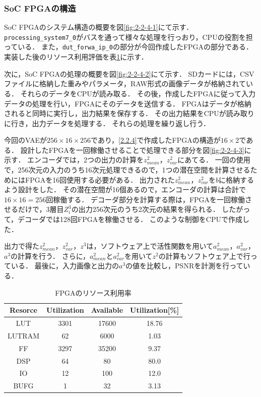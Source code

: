 \documentclass[paper]{ieicej}
\begin{document}
\subsubsection{SoC FPGAの構造}\label{2.2.5}
SoC FPGAのシステム構造の概要を図\ref{fig:2-2-4-1}にて示す．
\texttt{processing\_system7\_0}がバスを通って様々な処理を行っおり，CPUの役割を担っている．
また，\texttt{dut\_forwa\_ip\_0}の部分が今回作成したFPGAの部分である．
実装した後のリソース利用評価を表\ref{tb:3}に示す．

次に，SoC FPGAの処理の概要を図\ref{fig:2-2-4-2}にて示す．
SDカードには，CSVファイルに格納した重みやパラメータ，RAW形式の画像データが格納されている．
それらのデータをCPUが読み取る．
その後，作成したFPGAに従って入力データの処理を行い，FPGAにそのデータを送信する．
FPGAはデータが格納されると同時に実行し，出力結果を保存する．
その出力結果をCPUが読み取りに行き，出力データを処理する．
それらの処理を繰り返し行う．

今回のVAEが$256\times16\times256$であり，\ref{2.2.4}で作成したFPGAの構造が$16\times2$である．
設計したFPGAを一回稼働させることで処理できる部分を図\ref{fig:2-2-4-3}に示す．
エンコーダでは，2つの出力の計算を$z^2_{mean}$，$z^2_{var}$にあてる．
一回の使用で，256次元の入力のうち16次元処理できるので，1つの潜在空間を計算させるためにはFPGAを16回使用する必要がある．
出力された$z^2_{mean}$，$z^2_{var}$を$b$に格納するよう設計をした．
その潜在空間が16個あるので，エンコーダの計算は合計で$16\times16=256$回稼働する．
デコーダ部分を計算する際は，FPGAを一回稼働させるだけで，3層目$Z^3_i$の出力256次元のうち2次元の結果を得られる．
したがって，デコーダでは128回FPGAを稼働させる．
このような制御をCPUで作成した．

出力で得た$z^2_{mean}$，$z^2_{var}$，$z^3$は，ソフトウェア上で活性関数を用いて$a^2_{mean}$，$a^2_{var}$，$a^3$の計算を行う．
さらに，$a^2_{mean}$と$a^2_{var}$を用いて$z^2$の計算もソフトウェア上で行っている．
最後に，入力画像と出力の$a^3$の値を比較し，PSNRを計測を行っている．

\begin{table}[tb]
  \centering
  \caption{FPGAのリソース利用率}
  \small
  \begin{tabular}{|c|c|c|c|} \hline
    Resorce & Utilization & Available & Utilization[\%]\\ \hline
    LUT & 3301 & 17600 & 18.76 \\ \hline
    LUTRAM & 62 & 6000 & 1.03 \\ \hline
    FF & 3297 & 35200 & 9.37 \\ \hline
    DSP & 64 & 80 & 80.0 \\ \hline
    IO & 12 & 100 & 12.0 \\ \hline
    BUFG & 1 & 32 & 3.13 \\ \hline
  \end{tabular}
  \label{tb:3}
\end{table}
\end{document}
